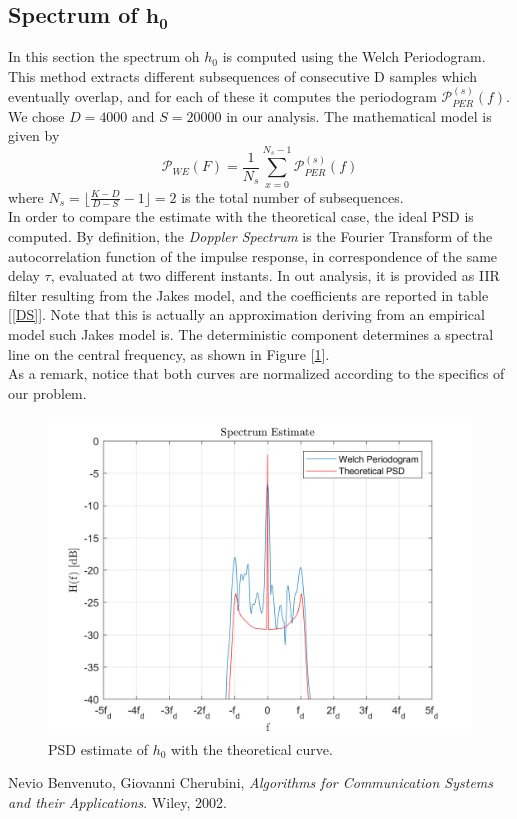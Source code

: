 \documentclass[a4paper, 12pt]{report}
\begin{document}
\clearpage
\subsection*{Spectrum of $\mathbf{h_0}$}
In this section the spectrum oh $h_0$ is computed using the Welch Periodogram. This method extracts different subsequences of consecutive D samples which eventually overlap, and for each of these it computes the periodogram $\mathcal{P}_{PER}^{\left(s\right)}(f)$. We chose $D=4000$ and $S=20000$ in our analysis. The mathematical model is given by
\begin{equation*}
\mathcal{P}_{WE}(F) = \frac{1}{N_s}\sum_{x=0}^{N_s-1}\mathcal{P}_{PER}^{(s)}(f)
\end{equation*}
where $N_s = \lfloor \frac{K-D}{D-S}-1 \rfloor = 2$ is the total number of subsequences. \\
In order to compare the estimate with the theoretical case, the ideal PSD is computed. By definition, the \textit{Doppler Spectrum} is the Fourier Transform of the autocorrelation function of the impulse response, in correspondence of the same delay $\tau$, evaluated at two different instants. In out analysis, it is provided as IIR filter resulting from the Jakes model, and the coefficients are reported in table [\ref{DS}]. Note that this is actually an approximation deriving from an empirical model such Jakes model is. The deterministic component determines a spectral line on the central frequency, as shown in Figure [\ref{Welch}].\\
As a remark, notice that both curves are normalized according to the specifics of our problem.

\begin{figure}[H]
	\centering
	\includegraphics[width=14cm]{images/Welch}
	\caption{PSD estimate of $h_0$ with the theoretical curve.}\label{Welch}
\end{figure}




\begin{thebibliography}{15}
	Nevio Benvenuto, Giovanni Cherubini,
	\textit{Algorithms for Communication Systems and their Applications}. 
	Wiley, 2002.
\end{thebibliography}
\end{document}
